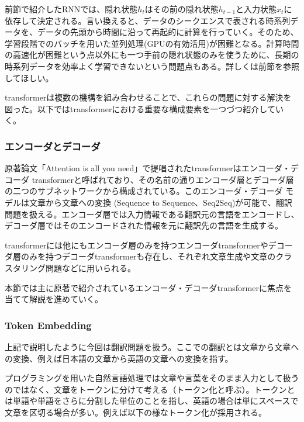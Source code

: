
前節で紹介したRNNでは、隠れ状態$h_t$はその前の隠れ状態$h_{t-1}$と入力状態$x_t$に依存して決定される。言い換えると、データのシークエンスで表される時系列データを、データの先頭から時間に沿って再起的に計算を行っていく。そのため、学習段階でのバッチを用いた並列処理(GPUの有効活用)が困難となる。計算時間の高速化が困難という点以外にも一つ手前の隠れ状態のみを使うために、長期の時系列データを効率よく学習できないという問題点もある。詳しくは前節を参照してほしい。

transformerは複数の機構を組み合わせることで、これらの問題に対する解決を図った。以下ではtransformerにおける重要な構成要素を一つづつ紹介していく。



\subsubsection{エンコーダとデコーダ}
原著論文「Attention is all you need」で提唱されたtransformerはエンコーダ・デコーダ transformerと呼ばれており、その名前の通りエンコーダ層とデコーダ層の二つのサブネットワークから構成されている。このエンコーダ・デコーダ モデルは文章から文章への変換 (Sequence to Sequence、Seq2Seq)が可能で、翻訳問題を扱える。エンコーダ層では入力情報である翻訳元の言語をエンコードし、デコーダ層ではそのエンコードされた情報を元に翻訳先の言語を生成する。

transformerには他にもエンコーダ層のみを持つエンコーダtransformerやデコーダ層のみを持つデコーダtransformerも存在し、それぞれ文章生成や文章のクラスタリング問題などに用いられる。

本節では主に原著で紹介されているエンコーダ・デコーダtransformerに焦点を当てて解説を進めていく。
\subsubsection{Token Embedding}
上記で説明したように今回は翻訳問題を扱う。ここでの翻訳とは文章から文章への変換、例えば日本語の文章から英語の文章への変換を指す。

プログラミングを用いた自然言語処理では文章や言葉をそのまま入力として扱うのではなく、文章をトークンに分けて考える（トークン化と呼ぶ）。トークンとは単語や単語をさらに分割した単位のことを指し、英語の場合は単にスペースで文章を区切る場合が多い。例えば以下の様なトークン化が採用される。


